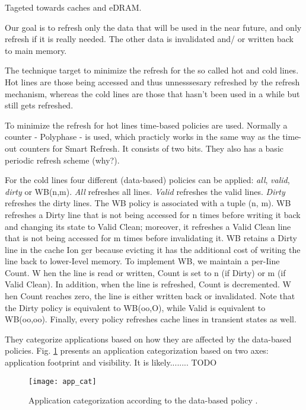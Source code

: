


Tageted towards caches and eDRAM.

Our goal is to refresh only the data that will be used in the near future, and only refresh if it is really needed. The other data is invalidated and/ or written back to main memory.

The technique target to minimize the refresh for the so called hot and cold lines. Hot lines are those being accessed and thus unnesssesary refreshed by the refresh mechanism, whereas the cold lines are those that hasn't been used in a while but still gets refreshed.

To minimize the refresh for hot lines time-based policies are used. Normally a counter - Polyphase - is used, which practicly works in the same way as the time-out counters for Smart Refresh. It consists of two bits. They also has a basic periodic refresh scheme (why?).

For the cold lines four different (data-based) policies can be applied: \textit{all}, \textit{valid}, \textit{dirty} or WB(n,m). \textit{All} refreshes all lines. \textit{Valid} refreshes the valid lines. \textit{Dirty} refreshes the dirty lines. The WB policy is associated with a tuple (n, m). WB refreshes a Dirty line that is not being accessed for n times before writing it back and changing its state to Valid Clean; moreover, it refreshes a Valid Clean line that is not being accessed for m times before invalidating it. WB retains a Dirty line in the cache Ion ger because evicting it has the additional cost of writing the line back to lower-Ievel memory. To implement WB, we maintain a per-Iine Count. W hen the line is read or written, Count is set to n (if Dirty) or m (if Valid Clean). In addition, when the line is refreshed, Count is decremented. W hen Count reaches zero, the line is either written back or invalidated. Note that the Dirty policy is equivalent to WB(oo,O), while Valid is equivalent to WB(oo,oo). Finally, every policy refreshes cache lines in transient states as well.

They categorize applications based on how they are affected by the data-based policies. Fig. \ref{fig:app_cat} presents an application categorization based on two axes: application footprint and visibility. It is likely........ TODO

\begin{figure}[t!]
	\texttt{[image: app\_cat]}
	\caption{Application categorization according to the data-based policy \cite{refrint}.}
	\label{fig:app_cat}
\end{figure}

